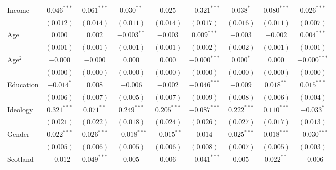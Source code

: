 \documentclass[12pt, letter]{article}
\begin{document}
\begin{table}[H]
\begin{center}
{\begin{tabular}{l c c c c c c c c }
Income                           & $0.046^{***}$  & $0.061^{***}$  & $0.030^{**}$   & $0.025$        & $-0.321^{***}$ & $0.038^{*}$    & $0.080^{***}$  & $0.026^{***}$  \\
                                 & $(0.012)$      & $(0.014)$      & $(0.011)$      & $(0.014)$      & $(0.017)$      & $(0.016)$      & $(0.011)$      & $(0.007)$      \\
Age                              & $0.000$        & $0.002$        & $-0.003^{**}$  & $-0.003$       & $0.009^{***}$  & $-0.003$       & $-0.002$       & $0.004^{***}$  \\
                                 & $(0.001)$      & $(0.001)$      & $(0.001)$      & $(0.001)$      & $(0.002)$      & $(0.002)$      & $(0.001)$      & $(0.001)$      \\
Age$^2$                            & $-0.000$       & $-0.000$       & $0.000$        & $0.000$        & $-0.000^{***}$ & $0.000^{*}$    & $0.000$        & $-0.000^{***}$ \\
                                 & $(0.000)$      & $(0.000)$      & $(0.000)$      & $(0.000)$      & $(0.000)$      & $(0.000)$      & $(0.000)$      & $(0.000)$      \\
Education                        & $-0.014^{*}$   & $0.008$        & $-0.006$       & $-0.002$       & $-0.046^{***}$ & $-0.009$       & $0.018^{**}$   & $0.015^{***}$  \\
                                 & $(0.006)$      & $(0.007)$      & $(0.005)$      & $(0.007)$      & $(0.009)$      & $(0.008)$      & $(0.006)$      & $(0.004)$      \\
Ideology                         & $0.321^{***}$  & $0.071^{**}$   & $0.249^{***}$  & $0.205^{***}$  & $-0.087^{***}$ & $0.222^{***}$  & $0.110^{***}$  & $-0.033^{*}$   \\
                                 & $(0.021)$      & $(0.022)$      & $(0.018)$      & $(0.024)$      & $(0.026)$      & $(0.027)$      & $(0.017)$      & $(0.013)$      \\
Gender                           & $0.022^{***}$  & $0.026^{***}$  & $-0.018^{***}$ & $-0.015^{**}$  & $0.014$        & $0.025^{***}$  & $0.018^{***}$  & $-0.030^{***}$ \\
                                 & $(0.005)$      & $(0.006)$      & $(0.005)$      & $(0.006)$      & $(0.008)$      & $(0.007)$      & $(0.005)$      & $(0.003)$      \\
Scotland                         & $-0.012$       & $0.049^{***}$  & $0.005$        & $0.006$        & $-0.041^{***}$ & $0.005$        & $0.022^{**}$   & $-0.006$       \\

\end{tabular}}
\end{center}
\end{table}
\end{document}
